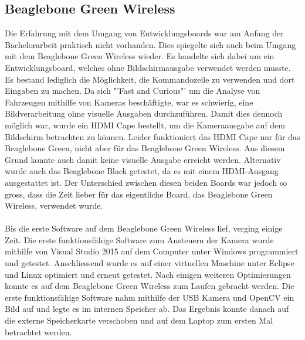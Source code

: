 \subsection{Beaglebone Green Wireless}
Die Erfahrung mit dem Umgang von Entwicklungsboards war am Anfang der Bachelorarbeit praktisch nicht vorhanden. Dies spiegelte sich auch beim Umgang mit dem Beaglebone Green Wireless wieder. Es handelte sich dabei um ein Entwicklungsboard, welches ohne Bildschirmausgabe verwendet werden musste. Es bestand lediglich die Möglichkeit, die Kommandozeile zu verwenden und dort Eingaben zu machen. Da sich "'Fast and Curious"' um die Analyse von Fahrzeugen mithilfe von Kameras beschäftigte, war es schwierig, eine Bildverarbeitung ohne visuelle Ausgaben durchzuführen. Damit dies dennoch möglich war, wurde ein HDMI Cape bestellt, um die Kameraausgabe auf dem Bildschirm betrachten zu können. Leider funktioniert das HDMI Cape nur für das Beaglebone Green, nicht aber für das Beaglebone Green Wireless. Aus diesem Grund konnte auch damit keine visuelle Ausgabe erreicht werden. 
Alternativ wurde auch das Beaglebone Black getestet, da es mit einem HDMI-Ausgang ausgestattet ist. Der Unterschied zwischen diesen beiden Boards war jedoch so gross, dass die Zeit lieber für das eigentliche Board, das Beaglebone Green Wireless, verwendet wurde.\\\\ 
Bis die erste Software auf dem Beaglebone Green Wireless lief, verging einige Zeit. Die erste funktionsfähige Software zum Ansteuern der Kamera wurde mithilfe von Visual Studio 2015 auf dem Computer unter Windows programmiert und getestet. Anschliessend wurde es auf einer virtuellen Maschine unter Eclipse und Linux optimiert und erneut getestet. Nach einigen weiteren Optimierungen konnte es auf dem Beaglebone Green Wireless zum Laufen gebracht werden. Die erste funktionsfähige Software nahm mithilfe der USB Kamera und OpenCV ein Bild auf und legte es im internen Speicher ab. Das Ergebnis konnte danach auf die externe Speicherkarte verschoben und auf dem Laptop zum ersten Mal betrachtet werden.